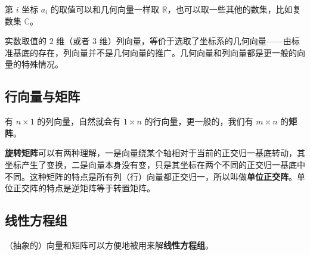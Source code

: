 第 $i$ 坐标 $a_i$ 的取值可以和几何向量一样取 $\mathbb{R}$，也可以取一些其他的数集，比如复数集 $\mathbb{C}$。


实数取值的 $2$ 维（或者 $3$ 维）列向量，等价于选取了坐标系的几何向量——由标准基底的存在，列向量并不是几何向量的推广。几何向量和列向量都是更一般的向量的特殊情况。

\subsection{行向量与矩阵}

有 $n \times 1$ 的列向量，自然就会有 $1 \times n$ 的行向量，更一般的，我们有 $m \times n$ 的\textbf{矩阵}。





\textbf{旋转矩阵}可以有两种理解，一是向量绕某个轴相对于当前的正交归一基底转动，其坐标产生了变换，二是向量本身没有变，只是其坐标在两个不同的正交归一基底中不同。这种矩阵的特点是所有列（行）向量都正交归一，所以叫做\textbf{单位正交阵}。单位正交阵的特点是逆矩阵等于转置矩阵。






\subsection{线性方程组}

（抽象的）向量和矩阵可以方便地被用来解\textbf{线性方程组}。
